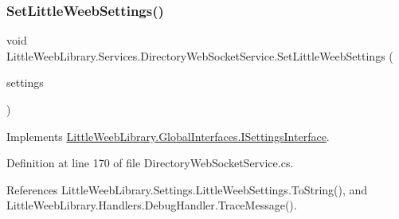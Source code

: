\subsubsection{\texorpdfstring{Set\+Little\+Weeb\+Settings()}{SetLittleWeebSettings()}}
{\footnotesize\ttfamily void Little\+Weeb\+Library.\+Services.\+Directory\+Web\+Socket\+Service.\+Set\+Little\+Weeb\+Settings (\begin{DoxyParamCaption}\item[{\mbox{\hyperlink{class_little_weeb_library_1_1_settings_1_1_little_weeb_settings}{Little\+Weeb\+Settings}}}]{settings }\end{DoxyParamCaption})}



Implements \mbox{\hyperlink{interface_little_weeb_library_1_1_global_interfaces_1_1_i_settings_interface_a5c53e44105f1f4c7f8c3e546d29939d7}{Little\+Weeb\+Library.\+Global\+Interfaces.\+I\+Settings\+Interface}}.



Definition at line 170 of file Directory\+Web\+Socket\+Service.\+cs.



References Little\+Weeb\+Library.\+Settings.\+Little\+Weeb\+Settings.\+To\+String(), and Little\+Weeb\+Library.\+Handlers.\+Debug\+Handler.\+Trace\+Message().


